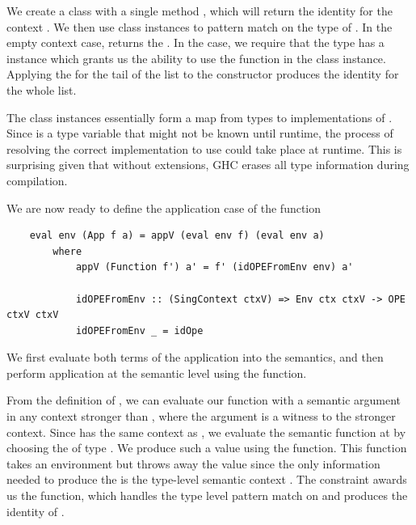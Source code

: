 We create a class  with a single method , which will return the identity  for the context . We then use class instances to pattern match on the type of . In the empty context case,  returns the  . In the  case, we require that the type  has a  instance which grants us the ability to use the  function in the class instance. Applying the  for the tail of the list to the  constructor produces the identity  for the whole list. 

The class instances essentially form a map from types to implementations of . Since  is a type variable that might not be known until runtime, the process of resolving the correct implementation to use could take place at runtime. This is surprising given that without extensions, GHC erases all type information during compilation. 




We are now ready to define the application case of the  function

\begin{lstlisting}
    eval env (App f a) = appV (eval env f) (eval env a) 
        where
            appV (Function f') a' = f' (idOPEFromEnv env) a'

            idOPEFromEnv :: (SingContext ctxV) => Env ctx ctxV -> OPE ctxV ctxV
            idOPEFromEnv _ = idOpe 
\end{lstlisting}

We first evaluate both terms of the application into the semantics, and then perform application at the semantic level using the  function. 

From the definition of , we can evaluate our function with a semantic argument in any context stronger than , where the  argument is a witness to the stronger context.
Since  has the same context  as , we evaluate the semantic function  at  by choosing the  of type . We produce such a value using the  function. This function takes an environment but throws away the value since the only information needed to produce the  is the type-level semantic context . The  constraint awards us the  function, which handles the type level pattern match on  and produces the identity  of . 

